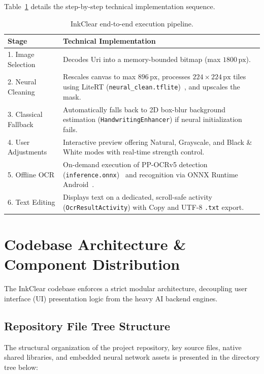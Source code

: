 \documentclass[11pt,a4paper]{article}
\begin{document}
Table~\ref{tab:workflow} details the step-by-step technical implementation sequence.

\begin{table}[h]
\centering
\small
\begin{tabular}{lp{10cm}}
\toprule
\textbf{Stage} & \textbf{Technical Implementation} \\
\midrule
1. Image Selection & Decodes Uri into a memory-bounded bitmap (max $1800\,\text{px}$). \\
2. Neural Cleaning & Rescales canvas to max $896\,\text{px}$, processes $224 \times 224\,\text{px}$ tiles using LiteRT (\texttt{neural\_clean.tflite})~\cite{david2021tflite}, and upscales the mask. \\
3. Classical Fallback & Automatically falls back to 2D box-blur background estimation (\texttt{HandwritingEnhancer}) if neural initialization fails. \\
4. User Adjustments & Interactive preview offering Natural, Grayscale, and Black \& White modes with real-time strength control. \\
5. Offline OCR & On-demand execution of PP-OCRv5 detection (\texttt{inference.onnx})~\cite{du2020ppocr} and recognition via ONNX Runtime Android~\cite{onnxruntime2021}. \\
6. Text Editing & Displays text on a dedicated, scroll-safe activity (\texttt{OcrResultActivity}) with Copy and UTF-8 \texttt{.txt} export. \\
\bottomrule
\end{tabular}
\caption{InkClear end-to-end execution pipeline.}
\label{tab:workflow}
\end{table}

\section{Codebase Architecture \& Component Distribution}

The InkClear codebase enforces a strict modular architecture, decoupling user interface (UI) presentation logic from the heavy AI backend engines.

\subsection{Repository File Tree Structure}

The structural organization of the project repository, key source files, native shared libraries, and embedded neural network assets is presented in the directory tree below:
\end{document}
